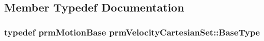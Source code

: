 \subsection{Member Typedef Documentation}
\hypertarget{classprm_velocity_cartesian_set_ade8ba9bb6ac994b5e7fd11084d3f54f1}{
\subsubsection[{Base\-Type}]{\setlength{\rightskip}{0pt plus 5cm}typedef {\bf prm\-Motion\-Base} {\bf prm\-Velocity\-Cartesian\-Set\-::\-Base\-Type}\hspace{0.3cm}{\ttfamily [protected]}}}\label{classprm_velocity_cartesian_set_ade8ba9bb6ac994b5e7fd11084d3f54f1}


